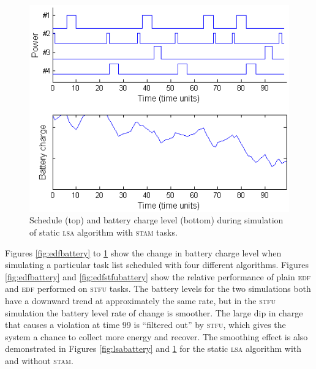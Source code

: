 \begin{figure}[tb]
\begin{center}
\includegraphics[scale=0.59]{lsastambattery.png}
\caption{Schedule (top) and battery charge level (bottom) during simulation of static \textsc{lsa} algorithm with \textsc{stam} tasks.\label{fig:lsastambattery}}
\end{center}
\end{figure}

Figures \ref{fig:edfbattery} to \ref{fig:lsastambattery} show the change in battery charge level when simulating a particular task list scheduled with four different algorithms.  
Figures \ref{fig:edfbattery} and \ref{fig:edfstfubattery} show the relative performance of plain \textsc{edf} and \textsc{edf} performed on \textsc{stfu} tasks.  The battery levels for the two simulations both have a downward trend at approximately the same rate, but in the \textsc{stfu} simulation the battery level rate of change is smoother.  
The large dip in charge that causes a violation at time 99 is ``filtered out'' by \textsc{stfu}, which gives the system a chance to collect more energy and recover.  The smoothing effect is also demonstrated in Figures \ref{fig:lsabattery} and \ref{fig:lsastambattery} for the static \textsc{lsa} algorithm with and without \textsc{stam}.




